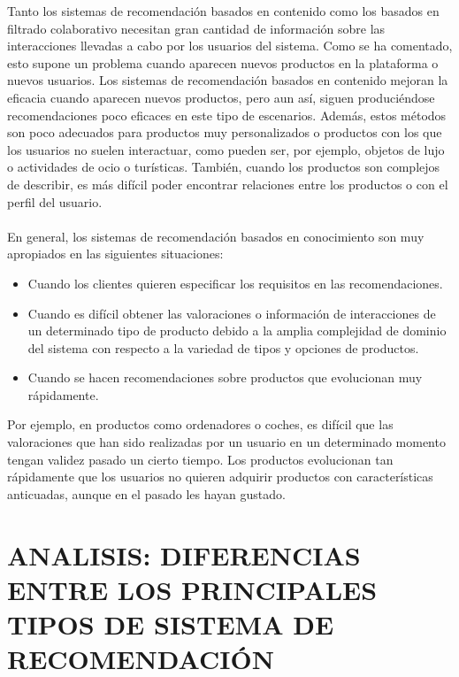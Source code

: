\documentclass[11pt,a4paper]{article}
\begin{document}
		 Tanto los sistemas de recomendación basados en contenido como los basados en filtrado colaborativo necesitan gran cantidad de información sobre las interacciones llevadas a cabo por los usuarios del sistema. Como se ha comentado, esto supone un problema cuando aparecen nuevos productos en la plataforma o nuevos usuarios. Los sistemas de recomendación basados en contenido mejoran la eficacia cuando aparecen nuevos productos, pero aun así, siguen produciéndose recomendaciones poco eficaces en este tipo de escenarios. Además, estos métodos son poco adecuados para productos muy personalizados o productos con los que los usuarios no suelen interactuar, como pueden ser, por ejemplo, objetos de lujo o actividades de ocio o turísticas. También, cuando los productos son complejos de describir, es más difícil poder encontrar relaciones entre los productos o con el perfil del usuario.\\
		 \\
		 En general, los sistemas de recomendación basados en conocimiento son muy apropiados en las siguientes situaciones: 
		 
		 \begin{itemize}
		 	\item Cuando los clientes quieren especificar los requisitos en las recomendaciones. 
		 	\item Cuando es difícil obtener las valoraciones o información de interacciones de un determinado tipo de producto debido a la amplia complejidad de dominio del sistema con respecto a la variedad de tipos y opciones de productos. 
		 	\item Cuando se hacen recomendaciones sobre productos que evolucionan muy rápidamente.
		 \end{itemize}
	
		 Por ejemplo, en productos como ordenadores o coches, es difícil que las valoraciones que han sido realizadas por un usuario en un determinado momento tengan validez pasado un cierto tiempo. Los productos evolucionan tan rápidamente que los usuarios no quieren adquirir productos con características anticuadas, aunque en el pasado les hayan gustado.
		 
		 
		 
		\section{ANALISIS: DIFERENCIAS ENTRE LOS PRINCIPALES TIPOS DE SISTEMA DE RECOMENDACIÓN}
		
\end{document}
